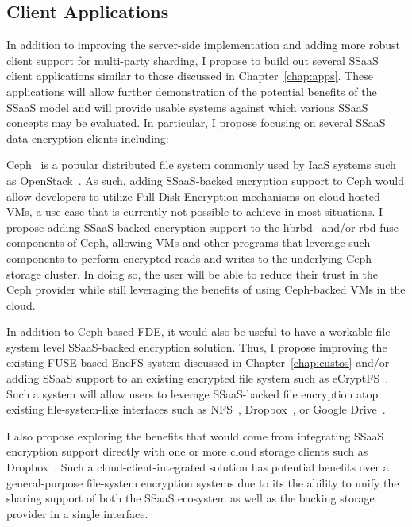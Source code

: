 \subsection{Client Applications}

In addition to improving the server-side implementation and adding
more robust client support for multi-party sharding, I propose to
build out several SSaaS client applications similar to those discussed
in Chapter~\ref{chap:apps}. These applications will allow further
demonstration of the potential benefits of the SSaaS model and will
provide usable systems against which various SSaaS concepts may be
evaluated. In particular, I propose focusing on several SSaaS data
encryption clients including:

\begin{packed_desc}
\item[Ceph Encryption Support:] Ceph~\cite{ceph} is a popular
  distributed file system commonly used by IaaS systems such as
  OpenStack~\cite{openstack}. As such, adding SSaaS-backed encryption
  support to Ceph would allow developers to utilize Full Disk
  Encryption mechanisms on cloud-hosted VMs, a use case that is
  currently not possible to achieve in most situations. I propose
  adding SSaaS-backed encryption support to the
  librbd~\cite{ceph-librbd-python, ceph-librbd-src} and/or
  rbd-fuse~\cite{ceph-rbdfuse} components of Ceph, allowing VMs and
  other programs that leverage such components to perform encrypted
  reads and writes to the underlying Ceph storage cluster. In doing
  so, the user will be able to reduce their trust in the Ceph provider
  while still leveraging the benefits of using Ceph-backed VMs in the
  cloud.
\item[File-system Encryption Support:] In addition to Ceph-based FDE,
  it would also be useful to have a workable file-system level
  SSaaS-backed encryption solution. Thus, I propose improving the
  existing FUSE-based EncFS system discussed in
  Chapter~\ref{chap:custos} and/or adding SSaaS support to an existing
  encrypted file system such as eCryptFS~\cite{ecryptfs}. Such a
  system will allow users to leverage SSaaS-backed file encryption
  atop existing file-system-like interfaces such as
  NFS~\cite{sandberg1985}, Dropbox~\cite{dropbox}, or Google
  Drive~\cite{google-drive}.
\item[Cloud Encryption Support:] I also propose exploring the benefits
  that would come from integrating SSaaS encryption support directly
  with one or more cloud storage clients such as
  Dropbox~\cite{dropbox}. Such a cloud-client-integrated solution has
  potential benefits over a general-purpose file-system encryption
  systems due to its the ability to unify the sharing support of both
  the SSaaS ecosystem as well as the backing storage provider in a
  single interface.
\end{packed_desc}

